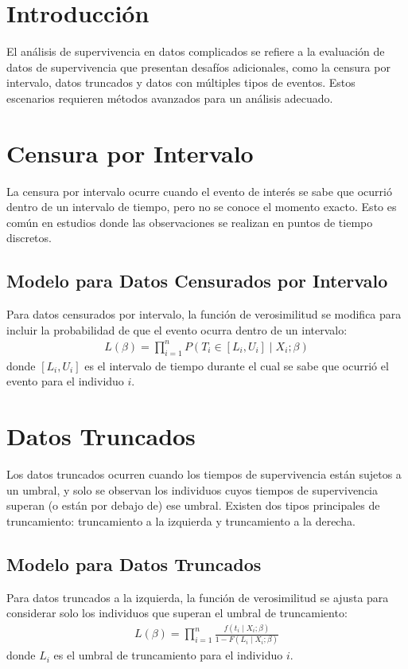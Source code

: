 
\section{Introducci\'on}
El análisis de supervivencia en datos complicados se refiere a la evaluaci\'on de datos de supervivencia que presentan desaf\'ios adicionales, como la censura por intervalo, datos truncados y datos con m\'ultiples tipos de eventos. Estos escenarios requieren m\'etodos avanzados para un análisis adecuado.

\section{Censura por Intervalo}
La censura por intervalo ocurre cuando el evento de inter\'es se sabe que ocurri\'o dentro de un intervalo de tiempo, pero no se conoce el momento exacto. Esto es com\'un en estudios donde las observaciones se realizan en puntos de tiempo discretos.

\subsection{Modelo para Datos Censurados por Intervalo}
Para datos censurados por intervalo, la funci\'on de verosimilitud se modifica para incluir la probabilidad de que el evento ocurra dentro de un intervalo:
\begin{eqnarray*}
L(\beta) = \prod_{i=1}^n P(T_i \in [L_i, U_i] \mid X_i; \beta)
\end{eqnarray*}
donde $[L_i, U_i]$ es el intervalo de tiempo durante el cual se sabe que ocurri\'o el evento para el individuo $i$.

\section{Datos Truncados}
Los datos truncados ocurren cuando los tiempos de supervivencia est\'an sujetos a un umbral, y solo se observan los individuos cuyos tiempos de supervivencia superan (o est\'an por debajo de) ese umbral. Existen dos tipos principales de truncamiento: truncamiento a la izquierda y truncamiento a la derecha.

\subsection{Modelo para Datos Truncados}
Para datos truncados a la izquierda, la funci\'on de verosimilitud se ajusta para considerar solo los individuos que superan el umbral de truncamiento:
\begin{eqnarray*}
L(\beta) = \prod_{i=1}^n \frac{f(t_i \mid X_i; \beta)}{1 - F(L_i \mid X_i; \beta)}
\end{eqnarray*}
donde $L_i$ es el umbral de truncamiento para el individuo $i$.

